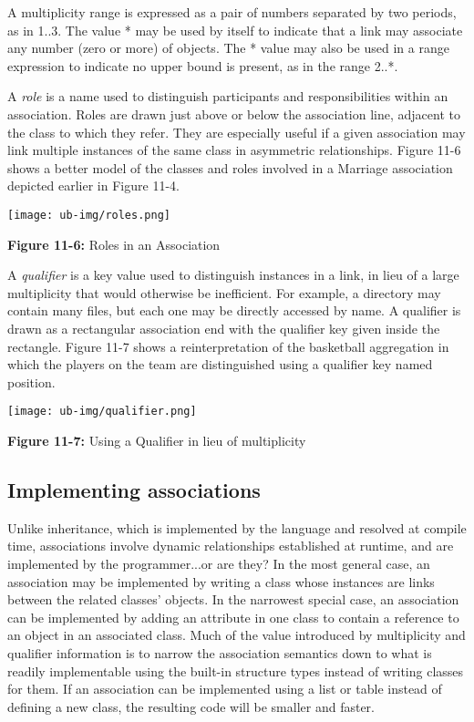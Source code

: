 A multiplicity range is expressed as a pair of numbers separated by two
periods, as in 1..3. The value * may be used by itself to indicate that
a link may associate any number (zero or more) of objects. The * value
may also be used in a range expression to indicate no upper bound is
present, as in the range 2..*.

A \textit{role} is a name used to distinguish
participants and responsibilities within an association. Roles are
drawn just above or below the association line, adjacent to the class
to which they refer. They are especially useful if a given association
may link multiple instances of the same class in asymmetric
relationships. Figure 11-6 shows a better model of the classes and
roles involved in a Marriage association depicted earlier in Figure
11-4.

\bigskip

\texttt{[image: ub-img/roles.png]}


{\sffamily\bfseries Figure 11-6:}
{\sffamily Roles in an Association}

\bigskip

A \textit{qualifier} is a key value used to
distinguish instances in a link, in lieu of a large
multiplicity that would otherwise be inefficient. For example, a
directory may contain many files, but each one may be directly accessed
by name. A qualifier is drawn as a rectangular association end with the
qualifier key given inside the rectangle. Figure 11-7 shows a
reinterpretation of the basketball aggregation in which the players on
the team are distinguished using a qualifier key named position.


\bigskip

\texttt{[image: ub-img/qualifier.png]}

{\sffamily\bfseries Figure 11-7:}
{\sffamily Using a Qualifier in lieu of multiplicity}

\subsection*{Implementing associations}

Unlike inheritance, which is implemented by the language and resolved at
compile time, associations involve dynamic
relationships established at runtime, and are implemented by the
programmer...or are they? In the most general case, an association may
be implemented by writing a class whose instances are links between the
related classes' objects. In the narrowest special
case, an association can be implemented by adding an attribute in one
class to contain a reference to an object in an
associated class. Much of the value introduced by multiplicity and
qualifier information is to narrow the association semantics down to
what is readily implementable using the built-in structure types
instead of writing classes for them. If an association can be
implemented using a list or table instead of defining a new class, the
resulting code will be smaller and faster.

